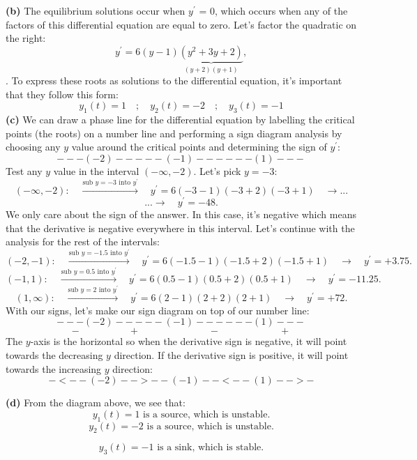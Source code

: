 \documentclass[a4paper,12pt]{article} %
\begin{document}
\textbf{(b)} The equilibrium solutions occur when $y^{\prime}$ = 0, which occurs when any of the factors of this differential equation are equal to zero. Let's factor the quadratic on the right:
$$ y^{\prime} = 6(y-1)\underbrace{(y^2+3y+2)}_{(y + 2)(y + 1)}, $$
. To express these roots as solutions to the differential equation, it's important that they follow this form:
$$ \boxed{y_1(t) = 1 \quad;\quad y_2(t) = -2 \quad;\quad y_3(t) = -1}$$
\textbf{(c)} We can draw a phase line for the differential equation by labelling the critical points (the roots) on a number line and performing a sign diagram analysis by choosing any $y$ value around the critical points and determining the sign of $y^{\prime}$:\\
$$ ---(-2)-----(-1)------(1)--- $$
Test any $y$ value in the interval $(-\infty, -2)$. Let's pick $y=-3$:
$$ (-\infty, -2): \quad\overset{\text{sub }y=-3\text{ into }y^{\prime}}\rightarrow \quad y^{\prime} = 6(-3-1)(-3 + 2)(-3+1) \quad\rightarrow ... $$
$$ ...\rightarrow \quad y^{\prime} = -48. $$
We only care about the sign of the answer. In this case, it's negative which means that the derivative is negative everywhere in this interval. Let's continue with the analysis for the rest of the intervals:
$$ (-2,-1): \quad\overset{\text{sub }y=-1.5\text{ into }y^{\prime}}\rightarrow \quad y^{\prime} = 6(-1.5-1)(-1.5+2)(-1.5+1) \quad\rightarrow \quad y^{\prime}=+3.75.$$
$$ (-1,1): \quad\overset{\text{sub }y=0.5\text{ into }y^{\prime}}\rightarrow \quad y^{\prime} = 6(0.5-1)(0.5+2)(0.5+1) \quad\rightarrow \quad y^{\prime} = -11.25.$$
$$ (1,\infty): \quad\overset{\text{sub }y=2\text{ into }y^{\prime}}\rightarrow \quad y^{\prime} = 6(2-1)(2+2)(2+1) \quad\rightarrow \quad y^{\prime} = +72. $$
With our signs, let's make our sign diagram on top of our number line:
$$ ---(-2)-----(-1)------(1)---  $$
$$ - \quad\quad\quad\quad\quad + \quad\quad\quad\quad\quad\quad\quad - \quad\quad\quad\quad\quad\quad + $$
The $y$-axis is the horizontal so when the derivative sign is negative, it will point towards the decreasing $y$ direction. If the derivative sign is positive, it will point towards the increasing $y$ direction:
$$ -<--(-2)-->--(-1)--<--(1)-->- $$
\pagebreak

\textbf{(d)} From the diagram above, we see that:
$$ \boxed{y_1(t) =1 \text{ is a source, which is unstable.}} $$
$$ \boxed{y_2(t) =-2 \text{ is a source, which is unstable.}} $$

$$\boxed{y_3(t) =-1 \text{ is a sink, which is stable.}} $$
\end{document}
